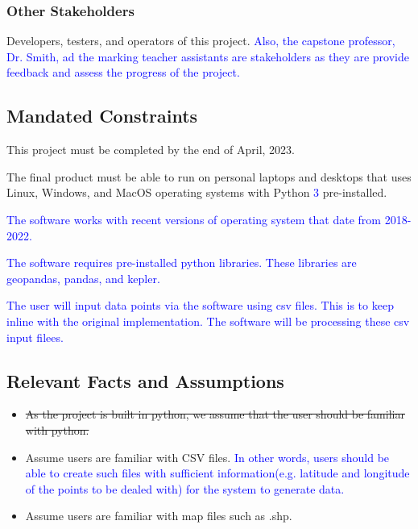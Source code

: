 \documentclass[12pt, titlepage]{article}
\begin{document}
\subsubsection{Other Stakeholders}
Developers, testers, and operators of this project. \textcolor{blue}{Also, the capstone professor, Dr. Smith, ad the marking teacher assistants are stakeholders as they are provide feedback and assess the progress of the project. }

\subsection{Mandated Constraints}
\begin{itemize}
    \item This project must be completed by the end of April, 2023.
    \item The final product must be able to run on personal laptops and desktops that uses Linux, Windows, and MacOS operating systems with Python \textcolor{blue}{3} pre-installed. \textcolor{blue}{The software works with recent versions of operating system that date from 2018-2022. 
    \item The software requires pre-installed python libraries. These libraries are geopandas, pandas, and kepler.
    \item The user will input data points via the software using csv files. This is to keep inline with the original implementation. The software will be processing these csv input filees.}
\end{itemize}


\subsection{Relevant Facts and Assumptions}
\begin{itemize}
    \item \sout{As the project is built in python, we assume that the user should be familiar with python.}
    \item Assume users are familiar with CSV files. \textcolor{blue}{ In other words, users should be able to create such files with sufficient information(e.g. latitude and longitude of the points to be dealed with) for the system to generate data.}
    \item Assume users are familiar with map files such as .shp.
\end{itemize}
\end{document}
